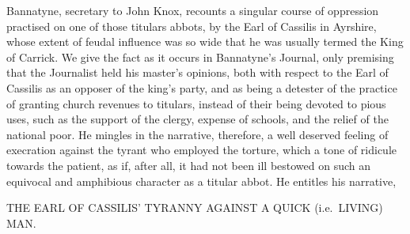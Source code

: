 Bannatyne, secretary to John Knox, recounts a singular course of
oppression practised on one of those titulars abbots, by the Earl of
Cassilis in Ayrshire, whose extent of feudal influence was so wide that
he was usually termed the King of Carrick. We give the fact as it occurs
in Bannatyne's Journal, only premising that the Journalist held his
master's opinions, both with respect to the Earl of Cassilis as an
opposer of the king's party, and as being a detester of the practice of
granting church revenues to titulars, instead of their being devoted to
pious uses, such as the support of the clergy, expense of schools, and
the relief of the national poor. He mingles in the narrative, therefore,
a well deserved feeling of execration against the tyrant who employed
the torture, which a tone of ridicule towards the patient, as if, after
all, it had not been ill bestowed on such an equivocal and amphibious
character as a titular abbot. He entitles his narrative,

THE EARL OF CASSILIS' TYRANNY AGAINST A QUICK (i.e.~LIVING) MAN.

